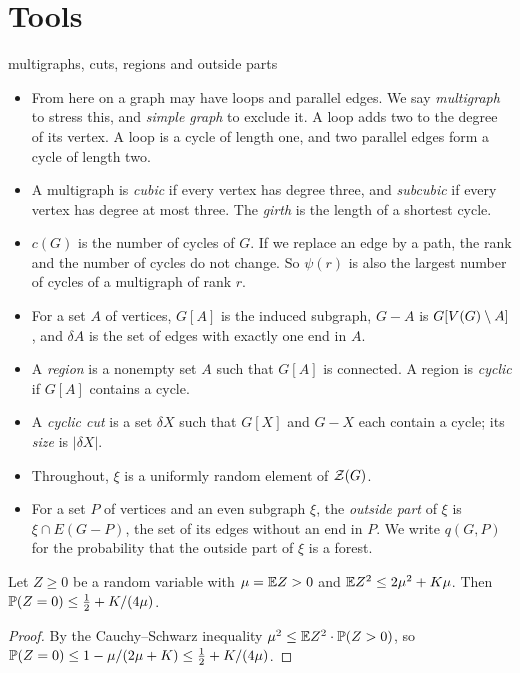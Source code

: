 \section{Tools}\label{sec:tools}

\begin{notation}{multigraphs, cuts, regions and outside parts}
\begin{itemize}[leftmargin=1.2em]
\item From here on a graph may have loops and parallel edges. We say \emph{multigraph} to stress
this, and \emph{simple graph} to exclude it. A loop adds two to the degree of its vertex. A loop is
a cycle of length one, and two parallel edges form a cycle of length two.
\item A multigraph is \emph{cubic} if every vertex has degree three, and \emph{subcubic} if every
vertex has degree at most three. The \emph{girth} is the length of a shortest cycle.
\item $c(G)$ is the number of cycles of $G$. If we replace an edge by a path, the rank and the
number of cycles do not change. So
$\psi(r)$ is also the largest number of cycles of a multigraph of rank $r$.
\item For a set $A$ of vertices, $G[A]$ is the induced subgraph, $G-A$ is $G[V(G)\setminus A]$, and
$\delta A$ is the set of edges with exactly one end in $A$.
\item A \emph{region} is a nonempty set $A$ such that $G[A]$ is connected. A region is
\emph{cyclic} if $G[A]$ contains a cycle.
\item A \emph{cyclic cut} is a set $\delta X$ such that $G[X]$ and $G-X$ each contain a cycle; its
\emph{size} is $|\delta X|$.
\item Throughout, $\xi$ is a uniformly random element of $\mathcal{Z}(G)$.
\item For a set $P$ of vertices and an even subgraph $\xi$, the \emph{outside part} of $\xi$ is
$\xi\cap E(G-P)$, the set of its edges without an end in $P$. We write $q(G,P)$ for the
probability that the outside part of $\xi$ is a forest.
\end{itemize}
\end{notation}

\begin{lemma}\label{lem:second}
Let $Z\ge0$ be a random variable with $\mu=\mathbb{E} Z>0$ and $\mathbb{E} Z^{2}\le2\mu^{2}+K\mu$. Then
$\mathbb{P}(Z=0)\le\tfrac12+K/(4\mu)$.
\end{lemma}

\begin{proof}
By the Cauchy--Schwarz inequality $\mu^{2}\le\mathbb{E} Z^{2}\cdot\mathbb{P}(Z>0)$, so
$\mathbb{P}(Z=0)\le1-\mu/(2\mu+K)\le\tfrac12+K/(4\mu)$.
\end{proof}


